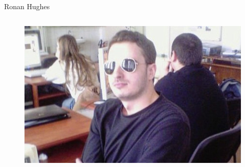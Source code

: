 \documentclass[nobackground,dvipsnames,table]{beamer}
\begin{document}
\begin{frame}{Ronan Hughes}
\begin{columns}
\begin{figure}
                \centering
                \includegraphics[width=\textwidth]{ronan-hughes-photo}
            \end{figure}
    \end{columns}
\end{frame}
\end{document}
